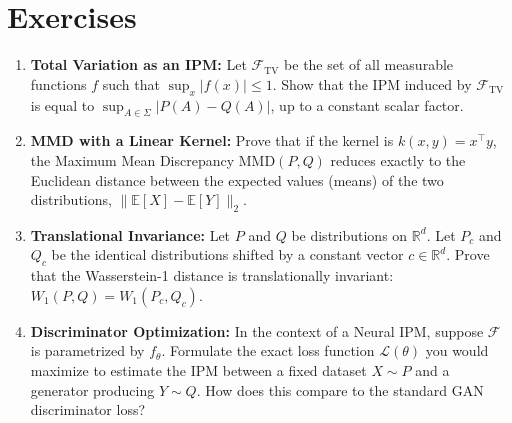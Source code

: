 \section{Exercises}

\begin{enumerate}
    \item \textbf{Total Variation as an IPM:} Let $\mathcal{F}_{\text{TV}}$ be the set of all measurable functions $f$ such that $\sup_x |f(x)| \le 1$. Show that the IPM induced by $\mathcal{F}_{\text{TV}}$ is equal to $\sup_{A \in \Sigma} |P(A) - Q(A)|$, up to a constant scalar factor. 
    \item \textbf{MMD with a Linear Kernel:} Prove that if the kernel is $k(x, y) = x^\top y$, the Maximum Mean Discrepancy $\text{MMD}(P, Q)$ reduces exactly to the Euclidean distance between the expected values (means) of the two distributions, $\| \mathbb{E}[X] - \mathbb{E}[Y] \|_2$.
    \item \textbf{Translational Invariance:} Let $P$ and $Q$ be distributions on $\mathbb{R}^d$. Let $P_c$ and $Q_c$ be the identical distributions shifted by a constant vector $c \in \mathbb{R}^d$. Prove that the Wasserstein-1 distance is translationally invariant: $W_1(P, Q) = W_1(P_c, Q_c)$.
    \item \textbf{Discriminator Optimization:} In the context of a Neural IPM, suppose $\mathcal{F}$ is parametrized by $f_\theta$. Formulate the exact loss function $\mathcal{L}(\theta)$ you would maximize to estimate the IPM between a fixed dataset $X \sim P$ and a generator producing $Y \sim Q$. How does this compare to the standard GAN discriminator loss?
\end{enumerate}

